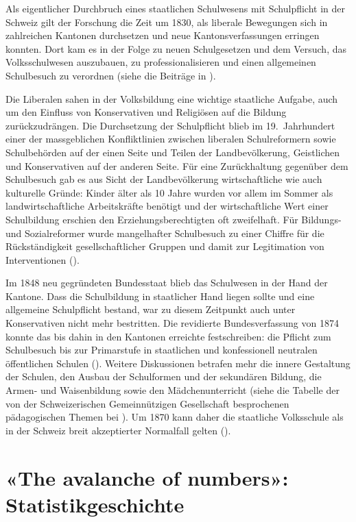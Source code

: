 Als eigentlicher Durchbruch eines staatlichen Schulwesens mit Schulpflicht in der Schweiz gilt der Forschung die Zeit um 1830, als liberale Bewegungen sich in zahlreichen Kantonen durchsetzen und neue Kantonsverfassungen erringen konnten. Dort kam es in der Folge zu neuen Schulgesetzen und dem Versuch, das Volksschulwesen auszubauen, zu professionalisieren und einen allgemeinen Schulbesuch zu verordnen (siehe die Beiträge in \cite{criblez_schule_1999}).

Die Liberalen sahen in der Volksbildung eine wichtige staatliche Aufgabe, auch um den Einfluss von Konservativen und Religiösen auf die Bildung zurückzudrängen. Die Durchsetzung der Schulpflicht blieb im 19.~Jahrhundert einer der massgeblichen Konfliktlinien zwischen liberalen Schulreformern sowie Schulbehörden auf der einen Seite und Teilen der Landbevölkerung, Geistlichen und Konservativen auf der anderen Seite. Für eine Zurückhaltung gegenüber dem Schulbesuch gab es aus Sicht der Landbevölkerung wirtschaftliche wie auch kulturelle Gründe: Kinder älter als 10 Jahre wurden vor allem im Sommer als landwirtschaftliche Arbeitskräfte benötigt und der wirtschaftliche Wert einer Schulbildung erschien den Erziehungsberechtigten oft zweifelhaft. Für Bildungs- und Sozialreformer wurde mangelhafter Schulbesuch zu einer Chiffre für die Rückständigkeit gesellschaftlicher Gruppen und damit zur Legitimation von Interventionen (\cite[602]{dodde_von_1991}). 

Im 1848 neu gegründeten Bundesstaat blieb das Schulwesen in der Hand der Kantone. Dass die Schulbildung in staatlicher Hand liegen sollte und eine allgemeine Schulpflicht bestand, war zu diesem Zeitpunkt auch unter Konservativen nicht mehr bestritten. Die revidierte Bundesverfassung von 1874 konnte das bis dahin in den Kantonen erreichte festschreiben: die Pflicht zum Schulbesuch bis zur Primarstufe in staatlichen und konfessionell neutralen öffentlichen Schulen (\cite{grunder_primarschule_2012}). Weitere Diskussionen betrafen mehr die innere Gestaltung der Schulen, den Ausbau der Schulformen und der sekundären Bildung, die Armen- und Waisenbildung sowie den Mädchenunterricht (siehe die Tabelle der von der Schweizerischen Gemeinnützigen Gesellschaft besprochenen pädagogischen Themen bei \cite[173]{criblez_schweizerische_2013}). Um 1870 kann daher die staatliche Volksschule als in der Schweiz breit akzeptierter Normalfall gelten (\cite[167]{trohler_classical_2011}). 

\section{«The avalanche of numbers»: Statistikgeschichte}

